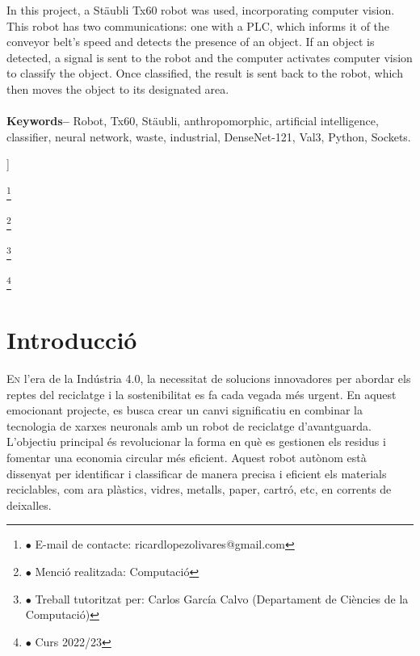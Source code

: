 ﻿\documentclass[10pt,a4paper,twocolumn,twoside]{article}
\newcommand\blfootnote[1]{%
  \begingroup
  \renewcommand\thefootnote{}\footnote{#1}%
  \addtocounter{footnote}{-1}%
  \endgroup
}
\begin{document}
\begin{@twocolumnfalse}
\begin{center}
{In this project, a Stäubli Tx60 robot was used, incorporating computer vision. This robot has two communications: one with a PLC, which informs it of the conveyor belt's speed and detects the presence of an object. If an object is detected, a signal is sent to the robot and the computer activates computer vision to classify the object. Once classified, the result is sent back to the robot, which then moves the object to its designated area.
\\
\\
\textbf{Keywords-- }  Robot, Tx60, Stäubli, anthropomorphic, artificial intelligence, classifier, neural network, waste, industrial, DenseNet-121, Val3, Python, Sockets.
\\
}

\bigskip

{\vrule depth 0pt height 0.5pt width 4cm\hspace{7.5pt}%
%
\hspace{7.5pt}\vrule depth 0pt height 0.5pt width 4cm\relax}

\end{center}

\bigskip
\end{@twocolumnfalse}]

\blfootnote{$\bullet$ E-mail de contacte: ricardlopezolivares@gmail.com}
\blfootnote{$\bullet$ Menció realitzada: Computació}
\blfootnote{$\bullet$ Treball tutoritzat per: Carlos García Calvo (Departament de Ciències de la Computació)}
\blfootnote{$\bullet$ Curs 2022/23}

\section{Introducció}

\lettrine[lines=3]{E}{n} l'era de la Indústria 4.0, la necessitat de solucions innovadores per abordar els reptes del reciclatge i la sostenibilitat es fa cada vegada més urgent. En aquest emocionant projecte, es busca crear un canvi significatiu en combinar la tecnologia de xarxes neuronals amb un robot de reciclatge d'avantguarda. L'objectiu principal és revolucionar la forma en què es gestionen els residus i fomentar una economia circular més eficient. Aquest robot autònom està dissenyat per identificar i classificar de manera precisa i eficient els materials reciclables, com ara plàstics, vidres,  metalls, paper, cartró, etc, en corrents de deixalles.
\\
\end{document}
